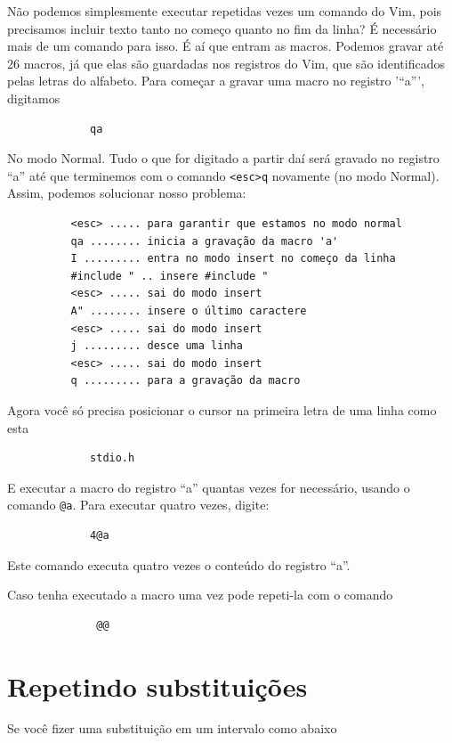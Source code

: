 \documentclass[10pt,a4paper,openany]{book}
\begin{document}
Não podemos simplesmente executar repetidas vezes um comando do Vim, pois
precisamos incluir texto tanto no começo quanto no fim da linha?  É necessário
mais de um comando para isso.  É aí que entram as macros. Podemos gravar até 26
macros, já que elas são guardadas nos registros do Vim, que são identificados
pelas letras do alfabeto. Para começar a gravar uma macro no registro '``a''',
digitamos

\begin{verbatim}
			 qa
\end{verbatim}

No modo Normal. Tudo o que for digitado a partir daí será gravado no
registro ``a'' até que terminemos com o comando
\verb|<esc>q| novamente (no modo Normal). Assim,
podemos solucionar nosso problema:

\begin{verbatim}
		  <esc> ..... para garantir que estamos no modo normal
		  qa ........ inicia a gravação da macro 'a'
		  I ......... entra no modo insert no começo da linha
		  #include " .. insere #include "
		  <esc> ..... sai do modo insert
		  A" ........ insere o último caractere
		  <esc> ..... sai do modo insert
		  j ......... desce uma linha
		  <esc> ..... sai do modo insert
		  q ......... para a gravação da macro
\end{verbatim}

Agora você só precisa posicionar o cursor na primeira letra de uma linha como esta

\begin{verbatim}
			 stdio.h
\end{verbatim}

E executar a macro do registro ``a'' quantas vezes for necessário,
usando o comando \verb|@a|. Para executar quatro vezes, digite:

\begin{verbatim}
			 4@a
\end{verbatim}

Este comando executa quatro vezes o conteúdo do registro ``a''.

Caso tenha executado a macro uma vez pode repeti-la com o comando

\begin{verbatim}
			  @@
\end{verbatim}

\section{Repetindo substituições }
Se você fizer uma substituição em um intervalo como abaixo
\end{document}
